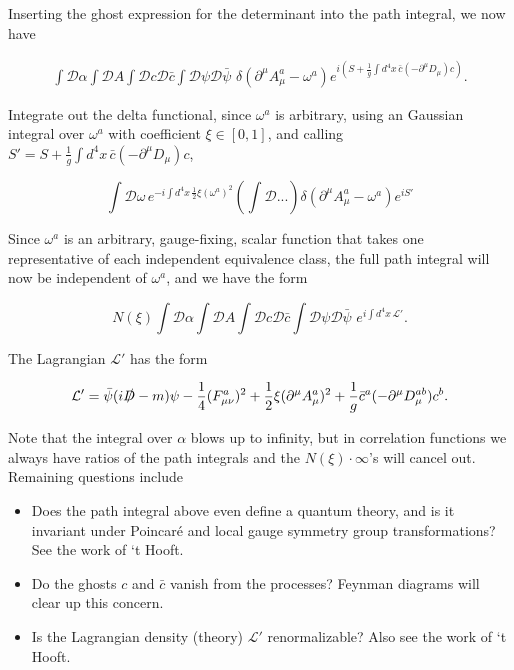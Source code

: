 \noindent Inserting the ghost expression for the determinant into the path integral, we now have

\begin{align}
\int \mathcal{D} \alpha \int \mathcal{D} A \int \mathcal{D} c \mathcal{D} \bar{c} \int \mathcal{D} \psi \mathcal{D} \bar{\psi} \,\, \delta( \partial^\mu A^a_\mu - \omega^a ) e^{i (S + \frac{1}{g} \int d^4 x \, \bar{c} (-\partial^\mu D_\mu) c)}.
\end{align}

\noindent Integrate out the delta functional, since $\omega^a$ is arbitrary, using an Gaussian integral over $\omega^a$ with coefficient $\xi \in [0,1]$, and calling $S' = S + \frac{1}{g} \int d^4 x \, \bar{c} (-\partial^\mu D_\mu) c$,

\begin{equation}
\int \mathcal{D} \omega \, e^{-i \int d^4 x \, \frac{1}{2} \xi (\omega^a)^2} \left( \int \mathcal{D} ... \right) \delta( \partial^\mu A_\mu^a - \omega^a) e^{i S'}
\end{equation}

\noindent Since $\omega^a$ is an arbitrary, gauge-fixing, scalar function that takes one representative of each independent equivalence class, the full path integral will now be independent of $\omega^a$, and we have the form

\begin{equation}
N(\xi) \int \mathcal{D} \alpha \int \mathcal{D} A \int \mathcal{D} c \mathcal{D} \bar{c} \int \mathcal{D} \psi \mathcal{D} \bar{\psi} \,\,  e^{i \int d^4 x \, \mathcal{L}'} .
\end{equation}

\noindent The Lagrangian $\mathcal{L}'$ has the form

\begin{equation}
\mathcal{L}' = \bar{\psi} (i \slashed{D} - m) \psi - \frac{1}{4} (F^a_{\mu\nu})^2 + \frac{1}{2} \xi (\partial^\mu A_\mu^a)^2 + \frac{1}{g} \bar{c}^a (-\partial^\mu D_\mu^{ab}) c^b.
\end{equation}

\noindent Note that the integral over $\alpha$ blows up to infinity, but in correlation functions we always have ratios of the path integrals and the $N(\xi) \cdot \infty$'s will cancel out. \\

\noindent Remaining questions include

\begin{itemize}
\item Does the path integral above even define a quantum theory, and is it invariant under Poincar\'e and local gauge symmetry group transformations? 
	\subitem See the work of `t Hooft.
\item Do the ghosts $c$ and $\bar{c}$ vanish from the processes? 
	\subitem Feynman diagrams will clear up this concern.
\item Is the Lagrangian density (theory) $\mathcal{L}'$ renormalizable?
	\subitem Also see the work of `t Hooft.
\end{itemize}
